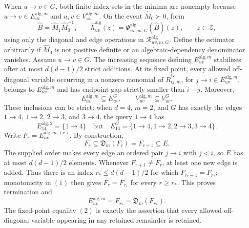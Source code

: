 When \(u\to v\in G\), both finite index sets in the minima are nonempty because \(u\to v\in E_{uv}^{\mathrm{alg},m}\) and \(u,v\in V_{uv}^{\mathrm{alg},m}\).
On the event \(\widehat M_0\succ0\), form
\[
 \widehat B=\widehat M_1\widehat M_0^{-1},
 \qquad
 \widehat h_{uv}^{\mathrm{alg}}(z)
 =\Phi^{\mathrm{alg}}_{uv,m,G}(\widehat B)(z),
 \qquad z\in\mathcal Z,
\]
using only the diagonal and edge operations in \(\mathscr R^{\mathrm{alg}}_{uv,m,G}\).  Define the estimator arbitrarily if \(\widehat M_0\) is not positive definite or an algebraic-dependency denominator vanishes.
Assume \(u\to v\in G\).  The increasing sequence defining \(E_{uv}^{\mathrm{alg},m}\) stabilizes after at most \(d(d-1)/2\) strict additions.  At its fixed point, every allowed off-diagonal variable occurring in a nonzero monomial of \(\overline R^{G}_{ij,m}\), for \(j\to i\in E_{uv}^{\mathrm{alg},m}\), belongs to \(E_{uv}^{\mathrm{alg},m}\) and has endpoint gap strictly smaller than \(i-j\).  Moreover,
\[
 E_{uv}^{\mathrm{alg},m}\subseteq E_{uv}^{G},
 \qquad
 V_{uv}^{\mathrm{alg},m}\subseteq V_{uv}^{G}.
\]
These inclusions can be strict: when \(d=4\), \(m=2\), and \(G\) has exactly the edges \(1\to4\), \(1\to2\), \(2\to3\), and \(3\to4\), the query \(1\to4\) has
\[
 E_{14}^{\mathrm{alg},2}=\{1\to4\}
 \quad\text{but}\quad
 E_{14}^{G}=\{1\to4,1\to2,2\to3,3\to4\}.
\]
Write \(F_r=E_{uv}^{\mathrm{alg},m,(r)}\).  By construction,
\[
 F_r\subseteq\mathfrak D_m(F_r)=F_{r+1}\subseteq E.
\tag{1}
\]
The supplied order makes every edge an ordered pair \(j\to i\) with \(j<i\), so \(E\) has at most \(d(d-1)/2\) elements.  Whenever \(F_{r+1}\ne F_r\), at least one new edge is added.  Thus there is an index \(r_*\le d(d-1)/2\) for which \(F_{r_*+1}=F_{r_*}\); monotonicity in \((1)\) then gives \(F_r=F_{r_*}\) for every \(r\ge r_*\).  This proves termination and
\[
 E_{uv}^{\mathrm{alg},m}=F_{r_*}=\mathfrak D_m(F_{r_*}).
\tag{2}
\]
The fixed-point equality \((2)\) is exactly the assertion that every allowed off-diagonal variable appearing in any retained remainder is retained.

